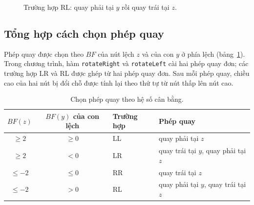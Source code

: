 \begin{figure}[htbp]
\centering
{}
\caption{Trường hợp RL: quay phải tại $y$ rồi quay trái tại $z$.}
\label{fig:quay-rl}
\end{figure}

\subsection{Tổng hợp cách chọn phép quay}

Phép quay được chọn theo $BF$ của nút lệch $z$ và của con $y$ ở phía lệch
(bảng~\ref{tab:chonquay}). Trong chương trình, hàm \texttt{rotateRight} và
\texttt{rotateLeft} cài hai phép quay đơn; các trường hợp LR và RL được ghép từ
hai phép quay đơn. Sau mỗi phép quay, chiều cao của hai nút bị đổi chỗ được tính
lại theo thứ tự từ nút thấp lên nút cao.

\begin{table}[htbp]
\centering
\begin{tabular}{|c|c|l|l|}
\hline
$BF(z)$ & $BF(y)$ của con lệch & Trường hợp & Phép quay \\
\hline
$\ge 2$  & $\ge 0$ & LL & quay phải tại $z$ \\
$\ge 2$  & $<0$    & LR & quay trái tại $y$, quay phải tại $z$ \\
$\le -2$ & $\le 0$ & RR & quay trái tại $z$ \\
$\le -2$ & $>0$    & RL & quay phải tại $y$, quay trái tại $z$ \\
\hline
\end{tabular}
\caption{Chọn phép quay theo hệ số cân bằng.}
\label{tab:chonquay}
\end{table}

